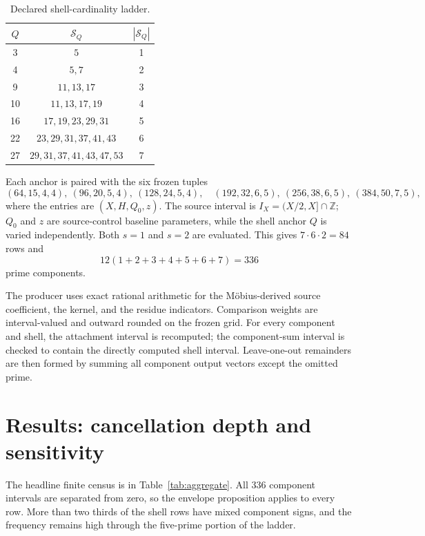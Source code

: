 \documentclass[11pt]{article}
\newcommand{\1}{\mathbf{1}}
\newcommand{\shell}{\mathcal S}
\begin{document}
\begin{table}[H]
\centering
\small
\caption{Declared shell-cardinality ladder.}
\label{tab:ladder}
\begin{tabular}{c|c|c}
\toprule
$Q$ & $\shell_Q$ & $|\shell_Q|$\\
\midrule
3  & $5$ & 1\\
4  & $5,7$ & 2\\
9  & $11,13,17$ & 3\\
10 & $11,13,17,19$ & 4\\
16 & $17,19,23,29,31$ & 5\\
22 & $23,29,31,37,41,43$ & 6\\
27 & $29,31,37,41,43,47,53$ & 7\\
\bottomrule
\end{tabular}
\end{table}

Each anchor is paired with the six frozen tuples
\begin{equation}
 (64,15,4,4),\ (96,20,5,4),\ (128,24,5,4),\quad
 (192,32,6,5),\ (256,38,6,5),\ (384,50,7,5),
 \label{eq:baselines}
\end{equation}
where the entries are $(X,H,Q_0,z)$.  The source interval is
$I_X=(X/2,X]\cap\mathbb Z$; $Q_0$ and $z$ are source-control baseline
parameters, while the shell anchor $Q$ is varied independently.  Both
$s=1$ and $s=2$ are evaluated.  This gives $7\cdot6\cdot2=84$ rows and
\[
 12(1+2+3+4+5+6+7)=336
\]
prime components.

The producer uses exact rational arithmetic for the M\"obius-derived source
coefficient, the kernel, and the residue indicators.  Comparison weights are
interval-valued and outward rounded on the frozen grid.  For every component
and shell, the attachment interval is recomputed; the component-sum interval
is checked to contain the directly computed shell interval.  Leave-one-out
remainders are then formed by summing all component output vectors except the
omitted prime.

\section{Results: cancellation depth and sensitivity}

The headline finite census is in Table~\ref{tab:aggregate}.  All 336
component intervals are separated from zero, so the envelope proposition
applies to every row.  More than two thirds of the shell rows have mixed
component signs, and the frequency remains high through the five-prime
portion of the ladder.
\end{document}
